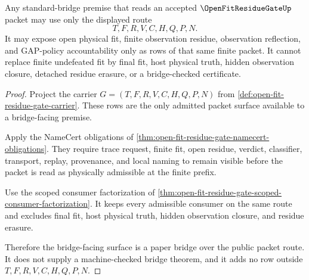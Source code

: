 \begin{theorem}
\label{thm:open-fit-residue-gate-paper-bridge-surface}
Any standard-bridge premise that reads an accepted $\OpenFitResidueGateUp$ packet may use only the displayed route
$$
T,F,R,V,C,H,Q,P,N .
$$
It may expose open physical fit, finite observation residue, observation reflection, and GAP-policy accountability only as rows of that same finite packet. It cannot replace finite undefeated fit by final fit, host physical truth, hidden observation closure, detached residue erasure, or a bridge-checked certificate.
\end{theorem}
\begin{proof}
Project the carrier $G=(T,F,R,V,C,H,Q,P,N)$ from \autoref{def:open-fit-residue-gate-carrier}. These rows are the only admitted packet surface available to a bridge-facing premise.

Apply the NameCert obligations of \autoref{thm:open-fit-residue-gate-namecert-obligations}. They require trace request, finite fit, open residue, verdict, classifier, transport, replay, provenance, and local naming to remain visible before the packet is read as physically admissible at the finite prefix.

Use the scoped consumer factorization of \autoref{thm:open-fit-residue-gate-scoped-consumer-factorization}. It keeps every admissible consumer on the same route and excludes final fit, host physical truth, hidden observation closure, and residue erasure.

Therefore the bridge-facing surface is a paper bridge over the public packet route. It does not supply a machine-checked bridge theorem, and it adds no row outside $T,F,R,V,C,H,Q,P,N$.
\end{proof}


